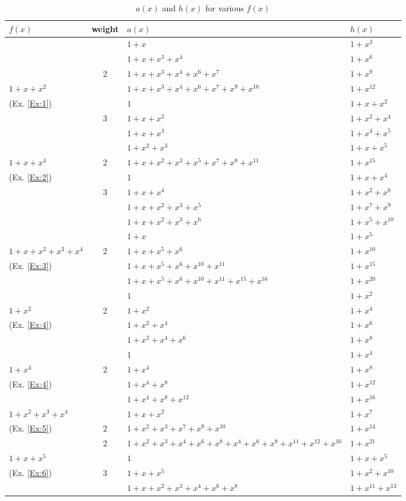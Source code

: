 \begin{table}[htbp]
\caption{$a(x)$ and $h(x)$ for various $f(x)$}
\centering
\begin{tabularx}{0.7\textwidth}{l|cXl} 
\toprule
$f(x)$ & weight & $a(x)$ & $h(x)$\\
\midrule
 &  & $1+x$ & $1+x^{3}$ \\
&  &$1+x+x^3+x^4$ & $1+x^{6}$  \\
& 2 &$1+x+x^3+x^4+x^6+x^{7}$ &  $1+x^{9}$ \\
$1+x+x^2$&& $1+x+x^3+x^4+x^6+x^{7}+x^9+x^{10}$&  $1+x^{12}$ \\
\cline{2-4}
(Ex. \ref{Ex:1})& &$1$ & $1+x+x^2$\\ 
& 3&$1+x+x^2$ &  $1+x^2+x^4$\\
& &$1+x+x^3$ & $1+x^4+x^5$\\
& &$1+x^2+x^3$ & $1+x+x^5$ \\
\cline{1-4}
$1+x+x^4$&2& $1 +x +x^2 +x^3+x^5+x^7+x^8+x^{11}$&  $1+x^{15}$ \\
\cline{2-4}
(Ex. \ref{Ex:2})& &$1$ & $1+x+x^4$\\ 
& 3&$1+x+x^4$ &  $1+x^2+x^8$\\
& &$1+x+x^2+x^3+x^5$ & $1+x^7+x^9$\\
& &$1+x+x^2+x^3+x^6$ & $1+x^5+x^{10}$ \\
\cline{1-4}
&&$1+x$ &$1+x^5$\\ 
$1+x+x^2+x^3+x^4$&2&$1+x+x^5+x^6$ &$1+x^{10}$  \\
(Ex. \ref{Ex:3})&&$1+x+x^5+x^6+x^{10}+x^{11}$ & $1+x^{15}$ \\
&&$1+x+x^5+x^6+x^{10}+x^{11}+x^{15}+x^{16}$ &$1+x^{20}$  \\
\cline{1-4}
&&$1$ & $1+x^2$\\ 
$1+x^2$&2&$1+x^2$ & $1+x^4$ \\
(Ex. \ref{Ex:4})&&$1+x^2+x^4$ & $1+x^6$\\
&&$1+x^2+x^4+x^6$ & $1+x^8$\\
\cline{1-4}
&&$1$ & $1+x^4$\\ 
$1+x^4$&2&$1+x^4$ & $1+x^8$ \\
(Ex. \ref{Ex:4})&&$1+x^4+x^8$ & $1+x^{12}$\\
&&$1+x^4+x^8+x^12$ & $1+x^{16}$\\
\cline{1-4}
$1+x^2+x^3+x^4$&&$1+x+x^2$& $1+x^{7}$ \\
(Ex. \ref{Ex:5})&2&$1+x^2+x^3+x^7+x^9+x^{10}$	& $1+x^{14}$ \\
\cline{1-4}
&2&$1+x^2+x^3+x^4+x^6+x^8+x^{4}+x^{6}+x^{8}+x^{11}+x^{12}+x^{16}$ &  $1+x^{21}$\\
\cline{2-4}
$1+x+x^5$&&$1$ & $1+x+x^{5}$\\ 
(Ex. \ref{Ex:6})&3&$1+x+x^5$ &  $1+x^2+x^{10}$\\
&&$1+x+x^2+x^3+x^4+x^{6}+x^{8}$ & $1+x^{11}+x^{13}$\\
\bottomrule
\end{tabularx}
\label{examples-table}
\end{table}






